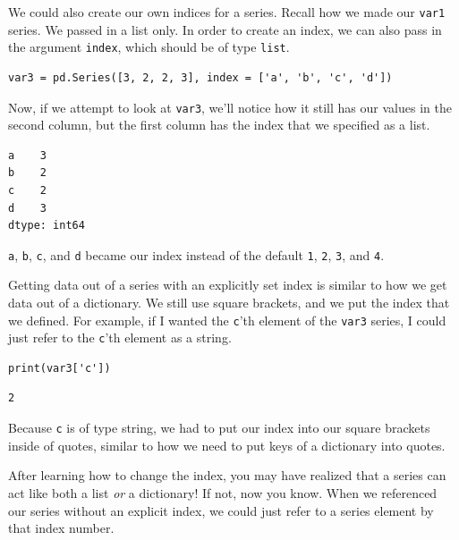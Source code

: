 \par
We could also create our own indices for a series. Recall how we made our \verb|var1| series. We passed in a list only. In order to create an index, we can also pass in the argument \verb|index|, which should be of type \verb|list|.\par
\begin{lstlisting}[style=pippython]
var3 = pd.Series([3, 2, 2, 3], index = ['a', 'b', 'c', 'd'])
\end{lstlisting}
Now, if we attempt to look at \verb|var3|, we'll notice how it still has our values in the second column, but the first column has the index that we specified as a list.\par
\begin{lstlisting}
a    3
b    2
c    2
d    3
dtype: int64
\end{lstlisting}
\verb|a|, \verb|b|, \verb|c|, and \verb|d| became our index instead of the default \verb|1|, \verb|2|, \verb|3|, and \verb|4|.\par
{}
Getting data out of a series with an explicitly set index is similar to how we get data out of a dictionary. We still use square brackets, and we put the index that we defined. For example, if I wanted the \verb|c|'th element of the \verb|var3| series, I could just refer to the \verb|c|'th element as a string.\par
\begin{lstlisting}[style=pippython]
print(var3['c'])
\end{lstlisting}
\begin{lstlisting}
2
\end{lstlisting}
Because \verb|c| is of type string, we had to put our index into our square brackets inside of quotes, similar to how we need to put keys of a dictionary into quotes.\par
After learning how to change the index, you may have realized that a series can act like both a list \textit{or} a dictionary! If not, now you know. When we referenced our series without an explicit index, we could just refer to a series element by that index number.

